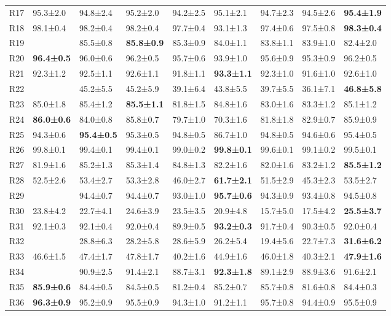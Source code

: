 \begin{table}
\begin{tabular}{lllllllll}
R17 & 95.3±2.0 & 94.8±2.4 & 95.2±2.0 & 94.2±2.5 & 95.1±2.1 & 94.7±2.3 & 94.5±2.6 & \textbf{95.4±1.9} \\
R18 & 98.1±0.4 & 98.2±0.4 & 98.2±0.4 & 97.7±0.4 & 93.1±1.3 & 97.4±0.6 & 97.5±0.8 & \textbf{98.3±0.4} \\
R19 &  & 85.5±0.8 & \textbf{85.8±0.9} & 85.3±0.9 & 84.0±1.1 & 83.8±1.1 & 83.9±1.0 & 82.4±2.0 \\
R20 & \textbf{96.4±0.5} & 96.0±0.6 & 96.2±0.5 & 95.7±0.6 & 93.9±1.0 & 95.6±0.9 & 95.3±0.9 & 96.2±0.5 \\
R21 & 92.3±1.2 & 92.5±1.1 & 92.6±1.1 & 91.8±1.1 & \textbf{93.3±1.1} & 92.3±1.0 & 91.6±1.0 & 92.6±1.0 \\
R22 &  & 45.2±5.5 & 45.2±5.9 & 39.1±6.4 & 43.8±5.5 & 39.7±5.5 & 36.1±7.1 & \textbf{46.8±5.8} \\
R23 & 85.0±1.8 & 85.4±1.2 & \textbf{85.5±1.1} & 81.8±1.5 & 84.8±1.6 & 83.0±1.6 & 83.3±1.2 & 85.1±1.2 \\
R24 & \textbf{86.0±0.6} & 84.0±0.8 & 85.8±0.7 & 79.7±1.0 & 70.3±1.6 & 81.8±1.8 & 82.9±0.7 & 85.9±0.9 \\
R25 & 94.3±0.6 & \textbf{95.4±0.5} & 95.3±0.5 & 94.8±0.5 & 86.7±1.0 & 94.8±0.5 & 94.6±0.6 & 95.4±0.5 \\
R26 & 99.8±0.1 & 99.4±0.1 & 99.4±0.1 & 99.0±0.2 & \textbf{99.8±0.1} & 99.6±0.1 & 99.1±0.2 & 99.5±0.1 \\
R27 & 81.9±1.6 & 85.2±1.3 & 85.3±1.4 & 84.8±1.3 & 82.2±1.6 & 82.0±1.6 & 83.2±1.2 & \textbf{85.5±1.2} \\
R28 & 52.5±2.6 & 53.4±2.7 & 53.3±2.8 & 46.0±2.7 & \textbf{61.7±2.1} & 51.5±2.9 & 45.3±2.3 & 53.5±2.7 \\
R29 &  & 94.4±0.7 & 94.4±0.7 & 93.0±1.0 & \textbf{95.7±0.6} & 94.3±0.9 & 93.4±0.8 & 94.5±0.8 \\
R30 & 23.8±4.2 & 22.7±4.1 & 24.6±3.9 & 23.5±3.5 & 20.9±4.8 & 15.7±5.0 & 17.5±4.2 & \textbf{25.5±3.7} \\
R31 & 92.1±0.3 & 92.1±0.4 & 92.0±0.4 & 89.9±0.5 & \textbf{93.2±0.3} & 91.7±0.4 & 90.3±0.5 & 92.0±0.4 \\
R32 &  & 28.8±6.3 & 28.2±5.8 & 28.6±5.9 & 26.2±5.4 & 19.4±5.6 & 22.7±7.3 & \textbf{31.6±6.2} \\
R33 & 46.6±1.5 & 47.4±1.7 & 47.8±1.7 & 40.2±1.6 & 44.9±1.6 & 46.0±1.8 & 40.3±2.1 & \textbf{47.9±1.6} \\
R34 &  & 90.9±2.5 & 91.4±2.1 & 88.7±3.1 & \textbf{92.3±1.8} & 89.1±2.9 & 88.9±3.6 & 91.6±2.1 \\
R35 & \textbf{85.9±0.6} & 84.4±0.5 & 84.5±0.5 & 81.2±0.4 & 85.2±0.7 & 85.7±0.8 & 81.6±0.8 & 84.4±0.3 \\
R36 & \textbf{96.3±0.9} & 95.2±0.9 & 95.5±0.9 & 94.3±1.0 & 91.2±1.1 & 95.7±0.8 & 94.4±0.9 & 95.5±0.9 \\
\bottomrule
\end{tabular}
\end{table}


